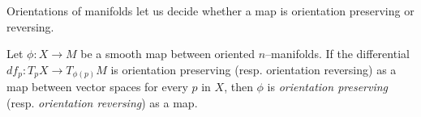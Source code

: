 Orientations of manifolds let us decide whether a map is orientation preserving or reversing.

\begin{defn}
	Let $\phi:X\to M$ be a smooth map between oriented $n$--manifolds.
	If the differential $df_p:T_p X\to T_{\phi(p)} M$ is orientation preserving (resp. orientation reversing) as a map between vector spaces for every $p$ in $X$, then $\phi$ is \emph{orientation preserving} (resp. \emph{orientation reversing}) as a map.
\end{defn}
